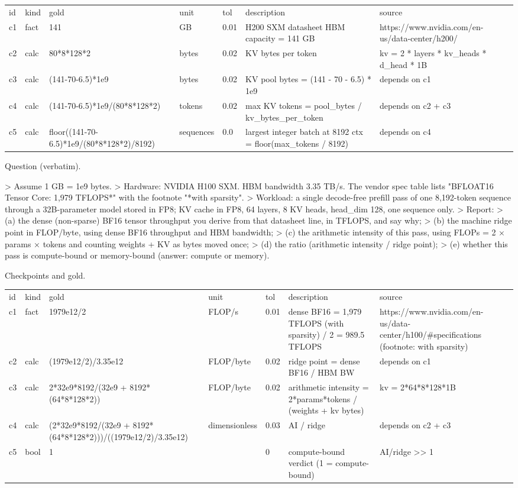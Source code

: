 \documentclass[10pt,twocolumn]{article}
\begin{document}
\begin{table}[h]
\centering
\begin{tabular}{lllllll}
id & kind & gold & unit & tol & description & source \\
c1 & fact & 141 & GB & 0.01 & H200 SXM datasheet HBM capacity = 141 GB & https://www.nvidia.com/en-us/data-center/h200/ \\
c2 & calc & 80*8*128*2 & bytes & 0.02 & KV bytes per token & kv = 2 * layers * kv\_heads * d\_head * 1B \\
c3 & calc & (141-70-6.5)*1e9 & bytes & 0.02 & KV pool bytes = (141 - 70 - 6.5) * 1e9 & depends on c1 \\
c4 & calc & (141-70-6.5)*1e9/(80*8*128*2) & tokens & 0.02 & max KV tokens = pool\_bytes / kv\_bytes\_per\_token & depends on c2 + c3 \\
c5 & calc & floor((141-70-6.5)*1e9/(80*8*128*2)/8192) & sequences & 0.0 & largest integer batch at 8192 ctx = floor(max\_tokens / 8192) & depends on c4
\end{tabular}
\end{table}


Question (verbatim).


> Assume 1 GB = 1e9 bytes. > Hardware: NVIDIA H100 SXM. HBM bandwidth 3.35 TB/s. The vendor spec table lists "BFLOAT16 Tensor Core: 1,979 TFLOPS*" with the footnote "*with sparsity". > Workload: a single decode-free prefill pass of one 8,192-token sequence through a 32B-parameter model stored in FP8; KV cache in FP8, 64 layers, 8 KV heads, head\_dim 128, one sequence only. > Report: > (a) the dense (non-sparse) BF16 tensor throughput you derive from that datasheet line, in TFLOPS, and say why; > (b) the machine ridge point in FLOP/byte, using dense BF16 throughput and HBM bandwidth; > (c) the arithmetic intensity of this pass, using FLOPs = 2 × params × tokens and counting weights + KV as bytes moved once; > (d) the ratio (arithmetic intensity / ridge point); > (e) whether this pass is compute-bound or memory-bound (answer: compute or memory).


Checkpoints and gold.


\begin{table}[h]
\centering
\begin{tabular}{lllllll}
id & kind & gold & unit & tol & description & source \\
c1 & fact & 1979e12/2 & FLOP/s & 0.01 & dense BF16 = 1,979 TFLOPS (with sparsity) / 2 = 989.5 TFLOPS & https://www.nvidia.com/en-us/data-center/h100/\#specifications (footnote: with sparsity) \\
c2 & calc & (1979e12/2)/3.35e12 & FLOP/byte & 0.02 & ridge point = dense BF16 / HBM BW & depends on c1 \\
c3 & calc & 2*32e9*8192/(32e9 + 8192*(64*8*128*2)) & FLOP/byte & 0.02 & arithmetic intensity = 2*params*tokens / (weights + kv bytes) & kv = 2*64*8*128*1B \\
c4 & calc & (2*32e9*8192/(32e9 + 8192*(64*8*128*2)))/((1979e12/2)/3.35e12) & dimensionless & 0.03 & AI / ridge & depends on c2 + c3 \\
c5 & bool & 1 &  & 0 & compute-bound verdict (1 = compute-bound) & AI/ridge >> 1
\end{tabular}
\end{table}
\end{document}
